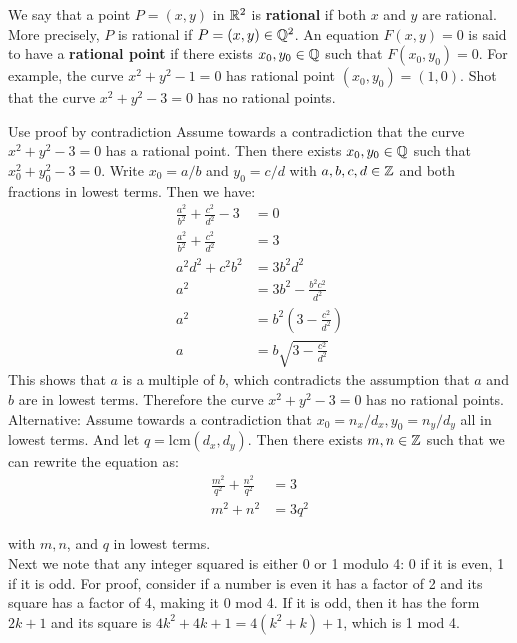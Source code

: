 \documentclass{article}
\begin{document}
\begin{problem}
We say that a point $P = (x,y)$ in $\mathbb{R}^2$ is \textbf{rational} if both $x$ and $y$ are rational. More precisely, $P$ is rational if $P = (x, y) \in \mathbb{Q}^2$. An equation $F(x,y)=0$ is said to have a \textbf{rational point} if there exists $x_0, y_0 \in \mathbb{Q}$ such that $F(x_0, y_0) = 0$. For example, the curve $x^2 + y^2 - 1 = 0$ has rational point $(x_0, y_0)=(1,0).$ Shot that the curve $x^2 + y^2 - 3 = 0$ has no rational points.
\end{problem}
\begin{solution}{Use proof by contradiction}
  Assume towards a contradiction that the curve $x^2 + y^2 - 3 = 0$ has a rational point. Then there exists $x_0, y_0 \in \mathbb{Q}$ such that $x_0^2 + y_0^2 - 3 = 0$. Write $x_0 = a/b$ and $y_0 = c/d$ with $a, b, c, d \in \mathbb{Z}$ and both fractions in lowest terms. Then we have:
  \begin{align*}
    \frac{a^2}{b^2} + \frac{c^2}{d^2} - 3 & = 0                                   \\
    \frac{a^2}{b^2} + \frac{c^2}{d^2}     & = 3                                   \\
    a^2d^2 + c^2b^2                       & = 3b^2d^2                             \\
    a^2                                   & = 3b^2 - \frac{b^2 c^2}{d^2}          \\
    a^2                                   & = b^2\left(3 - \frac{c^2}{d^2}\right) \\
    a                                     & = b\sqrt{3 - \frac{c^2}{d^2}}
  \end{align*}
  This shows that $a$ is a multiple of $b$, which contradicts the assumption that $a$ and $b$ are in lowest terms. Therefore the curve $x^2 + y^2 - 3 = 0$ has no rational points.
  \\

  Alternative: Assume towards a contradiction that $x_0 = n_x/d_x, y_0 = n_y/d_y$ all in lowest terms. And let $q = \text{lcm}(d_x, d_y)$. Then there exists $m, n \in \mathbb{Z}$ such that we can rewrite the equation as:
  \begin{align*}
    \frac{m^2}{q^2} + \frac{n^2}{q^2} & = 3    \\
    m^2 + n^2                         & = 3q^2
  \end{align*}

  with $m, n$, and $q$ in lowest terms.
  \\
  Next we note that any integer squared is either 0 or 1 modulo 4: 0 if it is even, 1 if it is odd. For proof, consider if a number is even it has a factor of 2 and its square has a factor of 4, making it 0 mod 4. If it is odd, then it has the form $2k + 1$ and its square is $4k^2 + 4k + 1 = 4(k^2 + k) + 1$, which is 1 mod 4.\\


\end{solution}
\end{document}
